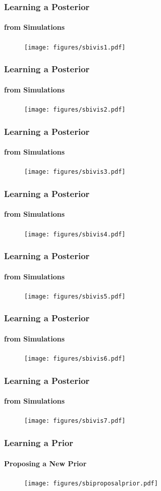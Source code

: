 \documentclass[9pt]{beamer}
\begin{document}
\begin{frame}
\frametitle{Learning a Posterior}
\framesubtitle{from Simulations}
\begin{figure}
	\texttt{[image: figures/sbivis1.pdf]}
\end{figure}
\end{frame} 
\begin{frame}
\frametitle{Learning a Posterior}
\framesubtitle{from Simulations}
\begin{figure}
	\texttt{[image: figures/sbivis2.pdf]}
\end{figure}
\end{frame} \begin{frame}
\frametitle{Learning a Posterior}
\framesubtitle{from Simulations}
\begin{figure}
\texttt{[image: figures/sbivis3.pdf]}
\end{figure}
\end{frame} \begin{frame}
\frametitle{Learning a Posterior}
\framesubtitle{from Simulations}
\begin{figure}
\texttt{[image: figures/sbivis4.pdf]}
\end{figure}
\end{frame} \begin{frame}
\frametitle{Learning a Posterior}
\framesubtitle{from Simulations}
\begin{figure}
\texttt{[image: figures/sbivis5.pdf]}
\end{figure}
\end{frame} \begin{frame}
\frametitle{Learning a Posterior}
\framesubtitle{from Simulations}
\begin{figure}
\texttt{[image: figures/sbivis6.pdf]}
\end{figure}
\end{frame}
\begin{frame}
\frametitle{Learning a Posterior}
\framesubtitle{from Simulations}
\begin{figure}
\texttt{[image: figures/sbivis7.pdf]}
\end{figure}
\end{frame}
\begin{frame}
\frametitle{Learning a Prior}
\framesubtitle{Proposing a New Prior}
\begin{figure}
	\texttt{[image: figures/sbiproposalprior.pdf]}
\end{figure}
\end{frame}  
\end{document}
